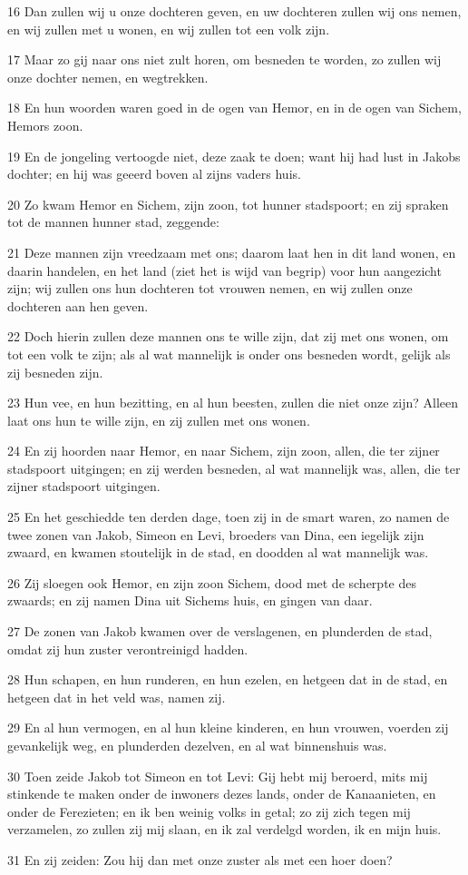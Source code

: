 \par 16 Dan zullen wij u onze dochteren geven, en uw dochteren zullen wij ons nemen, en wij zullen met u wonen, en wij zullen tot een volk zijn.
\par 17 Maar zo gij naar ons niet zult horen, om besneden te worden, zo zullen wij onze dochter nemen, en wegtrekken.
\par 18 En hun woorden waren goed in de ogen van Hemor, en in de ogen van Sichem, Hemors zoon.
\par 19 En de jongeling vertoogde niet, deze zaak te doen; want hij had lust in Jakobs dochter; en hij was geeerd boven al zijns vaders huis.
\par 20 Zo kwam Hemor en Sichem, zijn zoon, tot hunner stadspoort; en zij spraken tot de mannen hunner stad, zeggende:
\par 21 Deze mannen zijn vreedzaam met ons; daarom laat hen in dit land wonen, en daarin handelen, en het land (ziet het is wijd van begrip) voor hun aangezicht zijn; wij zullen ons hun dochteren tot vrouwen nemen, en wij zullen onze dochteren aan hen geven.
\par 22 Doch hierin zullen deze mannen ons te wille zijn, dat zij met ons wonen, om tot een volk te zijn; als al wat mannelijk is onder ons besneden wordt, gelijk als zij besneden zijn.
\par 23 Hun vee, en hun bezitting, en al hun beesten, zullen die niet onze zijn? Alleen laat ons hun te wille zijn, en zij zullen met ons wonen.
\par 24 En zij hoorden naar Hemor, en naar Sichem, zijn zoon, allen, die ter zijner stadspoort uitgingen; en zij werden besneden, al wat mannelijk was, allen, die ter zijner stadspoort uitgingen.
\par 25 En het geschiedde ten derden dage, toen zij in de smart waren, zo namen de twee zonen van Jakob, Simeon en Levi, broeders van Dina, een iegelijk zijn zwaard, en kwamen stoutelijk in de stad, en doodden al wat mannelijk was.
\par 26 Zij sloegen ook Hemor, en zijn zoon Sichem, dood met de scherpte des zwaards; en zij namen Dina uit Sichems huis, en gingen van daar.
\par 27 De zonen van Jakob kwamen over de verslagenen, en plunderden de stad, omdat zij hun zuster verontreinigd hadden.
\par 28 Hun schapen, en hun runderen, en hun ezelen, en hetgeen dat in de stad, en hetgeen dat in het veld was, namen zij.
\par 29 En al hun vermogen, en al hun kleine kinderen, en hun vrouwen, voerden zij gevankelijk weg, en plunderden dezelven, en al wat binnenshuis was.
\par 30 Toen zeide Jakob tot Simeon en tot Levi: Gij hebt mij beroerd, mits mij stinkende te maken onder de inwoners dezes lands, onder de Kanaanieten, en onder de Ferezieten; en ik ben weinig volks in getal; zo zij zich tegen mij verzamelen, zo zullen zij mij slaan, en ik zal verdelgd worden, ik en mijn huis.
\par 31 En zij zeiden: Zou hij dan met onze zuster als met een hoer doen?

